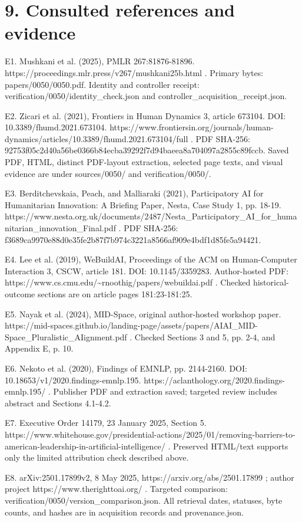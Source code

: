 \documentclass[10pt]{article}
\begin{document}
\section*{9. Consulted references and evidence}
E1. Mushkani et al. (2025), PMLR 267:81876-81896. https://proceedings.mlr.press/v267/mushkani25b.html . Primary bytes: papers/0050/0050.pdf. Identity and controller receipt: verification/0050/identity\_check.json and controller\_acquisition\_receipt.json.\par
E2. Zicari et al. (2021), Frontiers in Human Dynamics 3, article 673104. DOI: 10.3389/fhumd.2021.673104. https://www.frontiersin.org/journals/human-dynamics/articles/10.3389/fhumd.2021.673104/full . PDF SHA-256: 92753f05c2d40a56be0366b84ecba39292f7d94baeea8a704097a2855c89fccb. Saved PDF, HTML, distinct PDF-layout extraction, selected page texts, and visual evidence are under sources/0050/ and verification/0050/.\par
E3. Berditchevskaia, Peach, and Malliaraki (2021), Participatory AI for Humanitarian Innovation: A Briefing Paper, Nesta, Case Study 1, pp. 18-19. https://www.nesta.org.uk/documents/2487/Nesta\_Participatory\_AI\_for\_humanitarian\_innovation\_Final.pdf . PDF SHA-256: f3689ca9970e88d0e35fe2b87f7b974c3221a8566af909e4bdf1d85fe5a94421.\par
E4. Lee et al. (2019), WeBuildAI, Proceedings of the ACM on Human-Computer Interaction 3, CSCW, article 181. DOI: 10.1145/3359283. Author-hosted PDF: https://www.cs.cmu.edu/\textasciitilde{}rnoothig/papers/webuildai.pdf . Checked historical-outcome sections are on article pages 181:23-181:25.\par
E5. Nayak et al. (2024), MID-Space, original author-hosted workshop paper. https://mid-spaces.github.io/landing-page/assets/papers/AIAI\_MID-Space\_Pluralistic\_AIignment.pdf . Checked Sections 3 and 5, pp. 2-4, and Appendix E, p. 10.\par
E6. Nekoto et al. (2020), Findings of EMNLP, pp. 2144-2160. DOI: 10.18653/v1/2020.findings-emnlp.195. https://aclanthology.org/2020.findings-emnlp.195/ . Publisher PDF and extraction saved; targeted review includes abstract and Sections 4.1-4.2.\par
E7. Executive Order 14179, 23 January 2025, Section 5. https://www.whitehouse.gov/presidential-actions/2025/01/removing-barriers-to-american-leadership-in-artificial-intelligence/ . Preserved HTML/text supports only the limited attribution check described above.\par
E8. arXiv:2501.17899v2, 8 May 2025, https://arxiv.org/abs/2501.17899 ; author project https://www.therighttoai.org/ . Targeted comparison: verification/0050/version\_comparison.json. All retrieval dates, statuses, byte counts, and hashes are in acquisition records and provenance.json.\par
\end{document}
